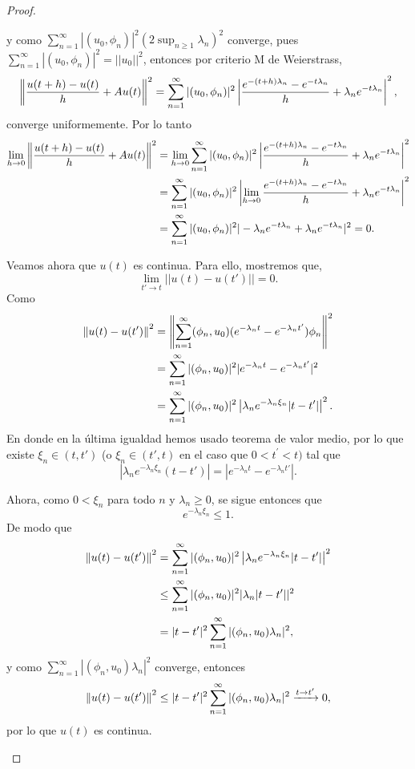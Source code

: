 \begin{proof}
\begin{enumerate}
y como $\displaystyle\sum_{n=1}^{\infty}|(u_{0},\phi_{n})|^{2}(2\sup_{n\ge1}\lambda_{n})^{2}$ converge, pues $\displaystyle \sum_{n=1}^{\infty}|(u_{0},\phi_{n})|^{2}=||u_0||^2$, entonces por criterio M de Weierstrass,
\[\left\|\frac{u(t+h)-u(t)}{h}+Au(t)\right\|^{2}=\sum_{n=1}^{\infty}|(u_{0},\phi_{n})|^{2}\left|\frac{e^{-(t+h)\lambda_{n}}-e^{-t\lambda_{n}}}{h}+\lambda_{n}e^{-t\lambda_{n}}\right|^{2}, \]
converge uniformemente. Por lo tanto
\begin{align*}
\lim_{h\rightarrow0}\left\|\frac{u(t+h)-u(t)}{h}+Au(t)\right\|^{2}&=\lim_{h\rightarrow0}\sum_{n=1}^{\infty}|(u_{0},\phi_{n})|^{2}\left|\frac{e^{-(t+h)\lambda_{n}}-e^{-t\lambda_{n}}}{h}+\lambda_{n}e^{-t\lambda_{n}}\right|^{2} \\&=\sum_{n=1}^{\infty}|(u_{0},\phi_{n})|^{2}\left|\lim_{h\rightarrow0}\frac{e^{-(t+h)\lambda_{n}}-e^{-t\lambda_{n}}}{h}+\lambda_{n}e^{-t\lambda_{n}}\right|^{2}
\\&=\sum_{n=1}^{\infty}|(u_{0},\phi_{n})|^{2}|-\lambda_{n}e^{-t\lambda_{n}}+\lambda_{n}e^{-t\lambda_{n}}|^{2}=0. \end{align*}

Veamos ahora que $u(t)$ es continua. Para ello, mostremos que, 
\[\lim_{t'\rightarrow t}||u(t)-u(t')||=0.\]
Como
\begin{align*}
\left\|u(t)-u(t^{\prime})\right\|^{2}&=\left\|\sum_{n=1}^{\infty}(\phi_{n},u_{0})(e^{-\lambda_{n}t}-e^{-\lambda_{n}t^{\prime}})\phi_{n}\right\|^{2}
\\&=\sum_{n=1}^{\infty}|(\phi_{n},u_{0})|^{2}|e^{-\lambda_{n}t}-e^{-\lambda_{n}t^{\prime}}|^{2}
\\&=\sum_{n=1}^{\infty}|(\phi_{n},u_{0})|^{2}\left|\lambda_{n}e^{-\lambda_{n}\xi_{n}}|t-t^{\prime}|\right|^{2}.
\end{align*}
En donde en la última igualdad hemos usado teorema de valor medio, por lo que existe $\xi_n \in (t, t')$ (o $\xi_n \in (t',t)$ en el caso que $0<t^{\prime}<t)$ tal que
\[|\lambda_n e^{-\lambda_n \xi_n} (t-t')| = |e^{-\lambda_n t} - e^{-\lambda_n t'}|.\]

Ahora, como $0<\xi_n$ para todo $n$ y $\lambda_{n}\ge0$, se sigue entonces que \[e^{-\lambda_n \xi_n}\le1.\]
De modo que
\begin{align*}
\left\|u(t)-u(t^{\prime})\right\|^{2}&=\sum_{n=1}^{\infty}|(\phi_{n},u_{0})|^{2}\left|\lambda_{n}e^{-\lambda_{n}\xi_{n}}|t-t^{\prime}|\right|^{2}
\\&\le\sum_{n=1}^{\infty}|(\phi_{n},u_{0})|^{2}|\lambda_{n}|t-t^{\prime}||^{2}
\\&=|t-t^{\prime}|^2\sum_{n=1}^{\infty}|(\phi_{n},u_{0})\lambda_{n}|^{2},
\end{align*}
y como $\displaystyle\sum_{n=1}^{\infty}|(\phi_n, u_0)\lambda_n|^2$ converge, entonces
\[\left\|u(t)-u(t^{\prime})\right\|^{2}\le|t-t^{\prime}|^2\sum_{n=1}^{\infty}|(\phi_{n},u_{0})\lambda_n|^{2}\xrightarrow{t\rightarrow t^{\prime}}0,\]
por lo que $u(t)$ es continua.


\end{enumerate}
\end{proof}
